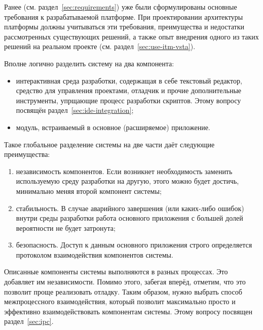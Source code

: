 Ранее (см. раздел~\ref{sec:requirements}) уже были сформулированы основные требования к разрабатываемой платформе. При проектировании архитектуры платформы должны учитываться эти требования, преимущества и недостатки рассмотренных существующих решений, а также опыт внедрения одного из таких решений на реальном проекте (см. раздел~\ref{sec:use-itm-vsta}).

Вполне логично разделить систему на два компонента:
\begin{itemize}
 \item интерактивная среда разработки, содержащая в себе текстовый редактор, средство для управления проектами, отладчик и прочие дополнительные инструменты, упрщающие процесс разработки скриптов. Этому вопросу посвящён раздел~\ref{sec:ide-integration};
 \item модуль, встраиваемый в основное (расширяемое) приложение.
\end{itemize}

Такое глобальное разделение системы на две части даёт следующие преимущества:
\begin{enumerate}
 \item независимость компонентов. Если возникнет необходимость заменить используемую среду разработки на другую, этого можно будет достичь, минимально меняя второй компонент системы;
 \item стабильность. В случае аварийного завершения (или каких-либо ошибок) внутри среды разработки работа основного приложения с большей долей вероятности не будет затронута;
 \item безопасность. Доступ к данным основного приложения строго определяется протоколом взаимодействия компонентов системы.
\end{enumerate}

Описанные компоненты системы выполняются в разных процессах. Это добавляет им независимости. Помимо этого, забегая вперёд, отметим, что это позволит проще реализовать отладку. Таким образом, нужно выбрать способ межпроцессного взаимодействия, который позволит максимально просто и эффективно взаимодействовать компонентам системы. Этому вопросу посвящен раздел~\ref{sec:ipc}.